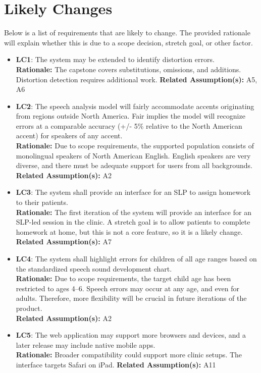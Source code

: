\documentclass[12pt]{article}
\begin{document}
\section{Likely Changes} \label{sec:likely-changes}

Below is a list of requirements that are likely to change. The provided rationale will explain whether this is due to a scope decision, stretch goal, or other factor. 
\begin{itemize}
    \item \textbf{LC1}: The system may be extended to identify distortion errors.\\
    \textbf{Rationale:} The capstone covers substitutions, omissions, and additions. Distortion detection requires additional work.
    \textbf{Related Assumption(s):} A5, A6

    \item \textbf{LC2}: The speech analysis model will fairly accommodate accents originating from regions outside North America. Fair implies the model will recognize errors at a comparable accuracy (+/- 5\% relative to the North American accent) for speakers of any accent.\\
    \textbf{Rationale:} Due to scope requirements, the supported population consists of monolingual speakers of North American English. English speakers are very diverse, and there must be adequate support for users from all backgrounds.\\
    \textbf{Related Assumption(s):} A2

    \item \textbf{LC3}: The system shall provide an interface for an SLP to assign homework to their patients.\\
    \textbf{Rationale:} The first iteration of the system will provide an interface for an SLP-led session in the clinic. A stretch goal is to allow patients to complete homework at home, but this is not a core feature, so it is a likely change.\\
    \textbf{Related Assumption(s):} A7

    \item \textbf{LC4}: The system shall highlight errors for children of all age ranges based on the standardized speech sound development chart.\\
    \textbf{Rationale:} Due to scope requirements, the target child age has been restricted to ages 4--6. Speech errors may occur at any age, and even for adults. Therefore, more flexibility will be crucial in future iterations of the product.\\
    \textbf{Related Assumption(s):} A2

    \item \textbf{LC5}: The web application may support more browsers and devices, and a later release may include native mobile apps.\\
    \textbf{Rationale:} Broader compatibility could support more clinic setups. The interface targets Safari on iPad.
    \textbf{Related Assumption(s):} A11
\end{itemize}
\end{document}
